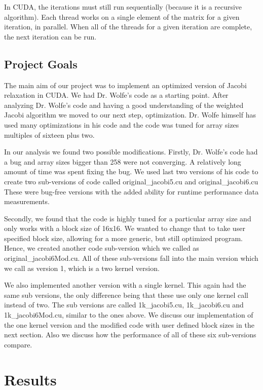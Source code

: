 \documentclass[10pt]{article}
\begin{document}
\begin{multicols}{2}
  In CUDA, the iterations must still run sequentially (because it is a recursive algorithm).
  Each thread works on a single element of the matrix for a given iteration, in parallel.
  When all of the threads for a given iteration are complete, the next iteration can be run.

  \subsection{Project Goals}
  The main aim of our project was to implement an optimized version of Jacobi relaxation in CUDA.
  We had Dr. Wolfe’s code \cite{bib:wolfe} as a starting point.
  After analyzing Dr. Wolfe’s code and having a good understanding of the weighted Jacobi algorithm we moved to our next step, optimization.
  Dr. Wolfe himself has used many optimizations in his code and the code was tuned for array sizes multiples of sixteen plus two.

  In our analysis we found two possible modifications.
  Firstly, Dr. Wolfe’s code had a bug and array sizes bigger than 258 were not converging.
  A relatively long amount of time was spent fixing the bug.
  We used last two versions of his code to create two sub-versions of code called original\_jacobi5.cu and original\_jacobi6.cu 
  These were bug-free versions with the added ability for runtime performance data measurements.

  Secondly, we found that the code is highly tuned for a particular array size and only works with a block size of 16x16.
  We wanted to change that to take user specified block size, allowing for a more generic, but still optimized program.
  Hence, we created another code sub-version which we called as original\_jacobi6Mod.cu.
  All of these sub-versions fall into the main version which we call as version 1, which is a two kernel version.

  We also implemented another version with a single kernel.
  This again had the same sub versions, the only difference being that these use only one kernel call instead of two.
  The sub versions are called 1k\_jacobi5.cu, 1k\_jacobi6.cu and 1k\_jacobi6Mod.cu, similar to the ones above.
  We discuss our implementation of the one kernel version and the modified code with user defined block sizes in the next section.
  Also we discuss how the performance of all of these six sub-versions compare.

  \section{Results}
  \label{sec:results}

\end{multicols}
\end{document}
